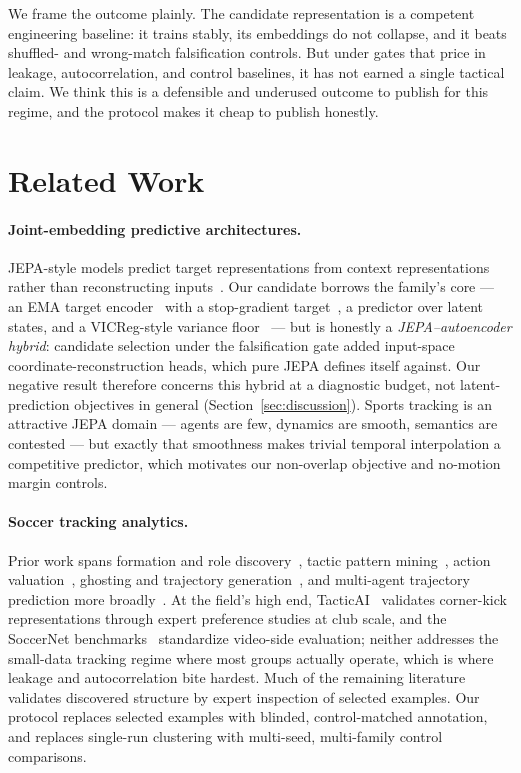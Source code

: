 \documentclass{article}
\begin{document}
We frame the outcome plainly. The candidate representation is a competent
engineering baseline: it trains stably, its embeddings do not collapse, and it
beats shuffled- and wrong-match falsification controls. But under gates that
price in leakage, autocorrelation, and control baselines, it has not earned a
single tactical claim. We think this is a defensible and underused outcome to
publish for this regime, and the protocol makes it cheap to publish honestly.

\section{Related Work}
\label{sec:related}

\paragraph{Joint-embedding predictive architectures.}
JEPA-style models predict target representations from context representations
rather than reconstructing inputs~\citep{lecun2022path,assran2023ijepa,bardes2024vjepa}.
Our candidate borrows the family's core --- an EMA target
encoder~\citep{grill2020byol} with a stop-gradient
target~\citep{chen2021simsiam}, a predictor over latent states, and a
VICReg-style variance floor~\citep{bardes2022vicreg} --- but is honestly a
\emph{JEPA--autoencoder hybrid}: candidate selection under the falsification
gate added input-space coordinate-reconstruction heads, which pure JEPA
defines itself against. Our negative result therefore concerns this hybrid at
a diagnostic budget, not latent-prediction objectives in general
(Section~\ref{sec:discussion}). Sports tracking is an attractive JEPA domain
--- agents are few, dynamics are smooth, semantics are contested --- but
exactly that smoothness makes trivial temporal interpolation a competitive
predictor, which motivates our non-overlap objective and no-motion margin
controls.

\paragraph{Soccer tracking analytics.}
Prior work spans formation and role discovery~\citep{bialkowski2014large,shaw2019dynamic},
tactic pattern mining~\citep{decroos2018tactics}, action
valuation~\citep{decroos2019actions,fernandez2018wide,spearman2018beyond},
ghosting and trajectory generation~\citep{le2017coordinated,yeh2019diverse,zhan2019generating},
and multi-agent trajectory prediction more broadly~\citep{alahi2016social,alcorn2021baller2vec}.
At the field's high end, TacticAI~\citep{wang2024tacticai} validates
corner-kick representations through expert preference studies at club scale,
and the SoccerNet benchmarks~\citep{giancola2018soccernet} standardize
video-side evaluation; neither addresses the small-data tracking regime where
most groups actually operate, which is where leakage and autocorrelation bite
hardest. Much of the remaining literature validates discovered structure by
expert inspection of selected examples. Our protocol replaces selected
examples with blinded, control-matched annotation, and replaces single-run
clustering with multi-seed, multi-family control comparisons.
\end{document}
